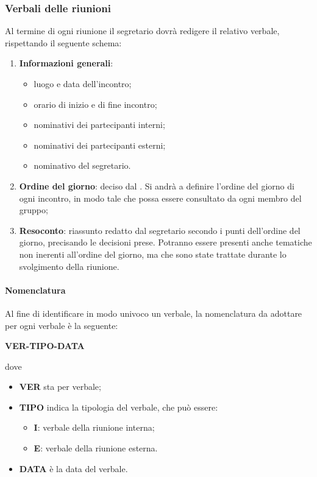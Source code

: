 \subsubsection{Verbali delle riunioni}
Al termine di ogni riunione il segretario dovrà redigere il relativo verbale, rispettando il seguente schema:
\begin{enumerate}
    \item \textbf{Informazioni generali}:
        \begin{itemize}
            \item luogo e data dell'incontro;
            \item orario di inizio e di fine incontro;
            \item nominativi dei partecipanti interni;
            \item nominativi dei partecipanti esterni;
            \item nominativo del segretario.
        \end{itemize}
    \item \textbf{Ordine del giorno}: deciso dal \roleProjectManager{}. Si andrà a definire l'ordine del giorno di ogni incontro, in modo tale che possa essere consultato da ogni membro del gruppo;
    \item \textbf{Resoconto}: riassunto redatto dal segretario secondo i punti dell'ordine del giorno, precisando le decisioni prese. Potranno essere presenti anche tematiche non inerenti all'ordine del giorno, ma che sono state trattate durante lo svolgimento della riunione.
\end{enumerate}
\paragraph{Nomenclatura}
Al fine di identificare in modo univoco un verbale, la nomenclatura da adottare per ogni verbale è la seguente: 
                    \begin{center}\textbf{VER-TIPO-DATA}\end{center}
dove 
\begin{itemize}
    \item \textbf{VER} sta per verbale;
    \item \textbf{TIPO} indica la tipologia del verbale, che può essere:
        \begin{itemize}
            \item \textbf{I}: verbale della riunione interna;
            \item \textbf{E}: verbale della riunione esterna.
        \end{itemize}
    \item \textbf{DATA} è la data del verbale.
    \end{itemize}

